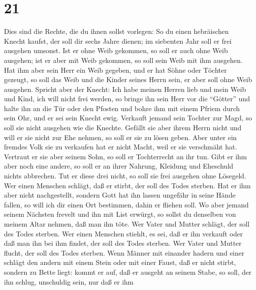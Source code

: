 \hypertarget{section-20}{%
\section{21}\label{section-20}}

 Dies sind die Rechte, die du ihnen sollst vorlegen:
 So du einen hebräischen Knecht kaufst, der soll dir sechs
Jahre dienen; im siebenten Jahr soll er frei ausgehen umsonst.
 Ist er ohne Weib gekommen, so soll er auch ohne Weib
ausgehen; ist er aber mit Weib gekommen, so soll sein Weib mit ihm
ausgehen.  Hat ihm aber sein Herr ein Weib gegeben, und er
hat Söhne oder Töchter gezeugt, so soll das Weib und die Kinder seines
Herrn sein, er aber soll ohne Weib ausgehen.  Spricht aber
der Knecht: Ich habe meinen Herren lieb und mein Weib und Kind, ich will
nicht frei werden,  so bringe ihn sein Herr vor die
``Götter'' und halte ihn an die Tür oder den Pfosten und bohre ihm mit
einem Pfriem durch sein Ohr, und er sei sein Knecht ewig. 
Verkauft jemand sein Tochter zur Magd, so soll sie nicht ausgehen wie
die Knechte.  Gefällt sie aber ihrem Herrn nicht und will er
sie nicht zur Ehe nehmen, so soll er sie zu lösen geben. Aber unter ein
fremdes Volk sie zu verkaufen hat er nicht Macht, weil er sie verschmäht
hat.  Vertraut er sie aber seinem Sohn, so soll er
Tochterrecht an ihr tun.  Gibt er ihm aber noch eine
andere, so soll er an ihrer Nahrung, Kleidung und Eheschuld nichts
abbrechen.  Tut er diese drei nicht, so soll sie frei
ausgehen ohne Lösegeld.  Wer einen Menschen schlägt, daß er
stirbt, der soll des Todes sterben.  Hat er ihm aber nicht
nachgestellt, sondern Gott hat ihn lassen ungefähr in seine Hände
fallen, so will ich dir einen Ort bestimmen, dahin er fliehen soll.
 Wo aber jemand seinem Nächsten frevelt und ihn mit List
erwürgt, so sollst du denselben von meinem Altar nehmen, daß man ihn
töte.  Wer Vater und Mutter schlägt, der soll des Todes
sterben.  Wer einen Menschen stiehlt, es sei, daß er ihn
verkauft oder daß man ihn bei ihm findet, der soll des Todes sterben.
 Wer Vater und Mutter flucht, der soll des Todes sterben.
 Wenn Männer mit einander hadern und einer schlägt den
andern mit einem Stein oder mit einer Faust, daß er nicht stirbt,
sondern zu Bette liegt:  kommt er auf, daß er ausgeht an
seinem Stabe, so soll, der ihn schlug, unschuldig sein, nur daß er ihm
